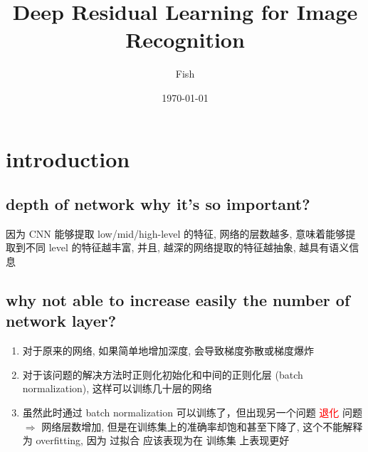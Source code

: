 \documentclass[12pt]{ctexart}%
\title{\kaishu Deep Residual Learning for Image Recognition}
\author{Fish}
\date{\today}
\begin{document}
	\maketitle
	\renewcommand{\contentsname}{Content} %
	\tableofcontents
	\clearpage
	\pagestyle{fancy}
	\setcounter{page}{1}
	
	\section{\quad introduction}
		\subsection{\quad depth of network why it's so important?} 
			
			因为 CNN 能够提取 low/mid/high-level 的特征, 网络的层数越多, 意味着能够提取到不同 level 的特征越丰富, 并且, 越深的网络提取的特征越抽象, 越具有语义信息
			
		\subsection{\quad why not able to increase easily the number of network layer?} 
			\begin{enumerate}
				\item 对于原来的网络, 如果简单地增加深度, 会导致梯度弥散或梯度爆炸
				
				\item 对于该问题的解决方法时正则化初始化和中间的正则化层 (batch normalization), 这样可以训练几十层的网络
				
				\item 虽然此时通过 batch normalization 可以训练了，但出现另一个问题 \textcolor{red}{退化} 问题
					$\Rightarrow$
					网络层数增加, 但是在训练集上的准确率却饱和甚至下降了, 这个不能解释为 overfitting, 因为 过拟合 应该表现为在 训练集 上表现更好
			\end{enumerate}
		
\end{document}
